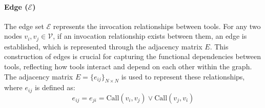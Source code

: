 \paragraph{Edge ($\mathcal{E}$)}
The edge set $\mathcal{E}$ represents the invocation relationships between tools. For any two nodes $v_i, v_j \in \mathcal{V}$, if an invocation relationship exists between them, an edge is established, which is represented through the adjacency matrix $E$. This construction of edges is crucial for capturing the functional dependencies between tools, reflecting how tools interact and depend on each other within the graph. The adjacency matrix $E = \{e_{ij}\}_{N\times N}$ is used to represent these relationships, where $e_{ij}$ is defined as:
\vskip -0.2in
\begin{equation}
    e_{ij} = e_{ji} = \text{Call}(v_i, v_j) \vee \text{Call}(v_j, v_i)
\end{equation}




